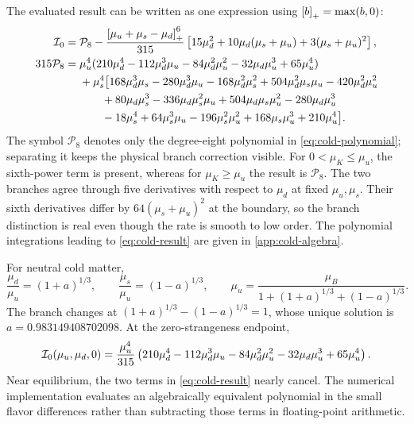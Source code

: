 The evaluated result can be written as one expression using \(\left[b\right]_+=\max(b,0)\):
\begin{align}
 \mathcal I_0={}&\mathcal P_8
 -\frac{\left[\mu_u+\mu_s-\mu_d\right]_+^{6}}{315}
 \left[15\mu_d^2+10\mu_d(\mu_s+\mu_u)+3(\mu_s+\mu_u)^2\right],
 \label{eq:cold-result}\\
 315\mathcal P_8={}&
 \mu_u^4(210\mu_d^4-112\mu_d^3\mu_u-84\mu_d^2\mu_u^2
            -32\mu_d\mu_u^3+65\mu_u^4)\notag\\
 &+\mu_s^4\big[168\mu_d^3\mu_s-280\mu_d^3\mu_u
 -168\mu_d^2\mu_s^2+504\mu_d^2\mu_s\mu_u-420\mu_d^2\mu_u^2\notag\\
 &\qquad+80\mu_d\mu_s^3-336\mu_d\mu_s^2\mu_u
 +504\mu_d\mu_s\mu_u^2-280\mu_d\mu_u^3\notag\\
 &\qquad-18\mu_s^4+64\mu_s^3\mu_u-196\mu_s^2\mu_u^2
 +168\mu_s\mu_u^3+210\mu_u^4\big].
 \label{eq:cold-polynomial}
\end{align}
The symbol \(\mathcal P_8\) denotes only the degree-eight polynomial in \cref{eq:cold-polynomial}; separating it keeps the physical branch correction visible.
For \(0<\mu_K\leq\mu_u\), the sixth-power term is present, whereas for \(\mu_K\geq\mu_u\) the result is \(\mathcal P_8\).
The two branches agree through five derivatives with respect to \(\mu_d\) at fixed \(\mu_u,\mu_s\).
Their sixth derivatives differ by \(64(\mu_s+\mu_u)^2\) at the boundary, so the branch distinction is real even though the rate is smooth to low order.
The polynomial integrations leading to \cref{eq:cold-result} are given in \cref{app:cold-algebra}.

For neutral cold matter,
\begin{equation}
 \frac{\mu_d}{\mu_u}=(1+a)^{1/3},\qquad
 \frac{\mu_s}{\mu_u}=(1-a)^{1/3},\qquad
 \mu_u=\frac{\mu_B}{1+(1+a)^{1/3}+(1-a)^{1/3}}.
 \label{eq:neutral-cold-a}
\end{equation}
The branch changes at \((1+a)^{1/3}-(1-a)^{1/3}=1\), whose unique solution is \(a=0.983149408702098\).
At the zero-strangeness endpoint,
\begin{equation}
 \mathcal I_0(\mu_u,\mu_d,0)=\frac{\mu_u^4}{315}
 \left(210\mu_d^4-112\mu_d^3\mu_u-84\mu_d^2\mu_u^2
 -32\mu_d\mu_u^3+65\mu_u^4\right).
 \label{eq:cold-strange-zero}
\end{equation}
Near equilibrium, the two terms in \cref{eq:cold-result} nearly cancel.
The numerical implementation evaluates an algebraically equivalent polynomial in the small flavor differences rather than subtracting those terms in floating-point arithmetic.
